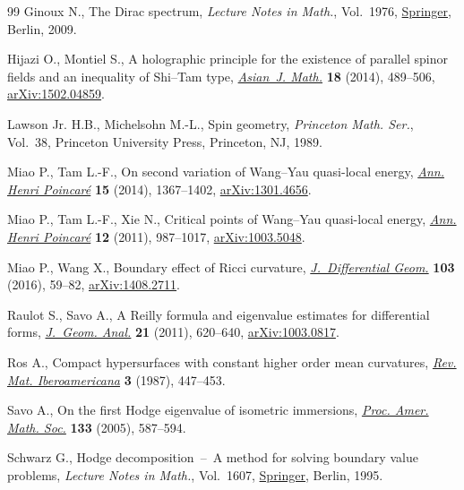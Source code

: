 \documentclass[pdftex]{sigma}
\numberwithin{equation}{section}
\begin{document}
\begin{thebibliography}{99}
Ginoux N., The {D}irac spectrum, \textit{Lecture Notes in Math.}, Vol.~1976,
  \href{https://doi.org/10.1007/978-3-642-01570-0}{Springer}, Berlin, 2009.

Hijazi O., Montiel S., A holographic principle for the existence of parallel
  spinor fields and an inequality of {S}hi--{T}am type, \href{https://doi.org/10.4310/AJM.2014.v18.n3.a6}{\textit{Asian~J. Math.}}
  \textbf{18} (2014), 489--506, \href{https://arxiv.org/abs/1502.04859}{arXiv:1502.04859}.

Lawson Jr. H.B., Michelsohn M.-L., Spin geometry, \textit{Princeton Math. Ser.},
  Vol.~38, Princeton University Press, Princeton, NJ, 1989.

Miao P., Tam L.-F., On second variation of {W}ang--{Y}au quasi-local energy,
  \href{https://doi.org/10.1007/s00023-013-0279-z}{\textit{Ann. Henri Poincar\'e}} \textbf{15} (2014), 1367--1402,
  \href{https://arxiv.org/abs/1301.4656}{arXiv:1301.4656}.

Miao P., Tam L.-F., Xie N., Critical points of {W}ang--{Y}au quasi-local energy,
  \href{https://doi.org/10.1007/s00023-011-0097-0}{\textit{Ann. Henri Poincar\'e}} \textbf{12} (2011), 987--1017,
  \href{https://arxiv.org/abs/1003.5048}{arXiv:1003.5048}.

Miao P., Wang X., Boundary effect of {R}icci curvature, \href{http://doi.org/10.4310/jdg/1460463563}{\textit{J.~Differential
  Geom.}} \textbf{103} (2016), 59--82, \href{https://arxiv.org/abs/1408.2711}{arXiv:1408.2711}.

Raulot S., Savo A., A {R}eilly formula and eigenvalue estimates for
  differential forms, \href{https://doi.org/10.1007/s12220-010-9161-0}{\textit{J.~Geom. Anal.}} \textbf{21} (2011), 620--640,
  \href{https://arxiv.org/abs/1003.0817}{arXiv:1003.0817}.

Ros A., Compact hypersurfaces with constant higher order mean curvatures,
  \href{https://doi.org/10.4171/RMI/58}{\textit{Rev. Mat. Iberoamericana}} \textbf{3} (1987), 447--453.

Savo A., On the first {H}odge eigenvalue of isometric immersions, \href{https://doi.org/10.1090/S0002-9939-04-07702-0}{\textit{Proc.
  Amer. Math. Soc.}} \textbf{133} (2005), 587--594.

Schwarz G., Hodge decomposition~--~A method for solving boundary value
  problems, \textit{Lecture Notes in Math.}, Vol.~1607, \href{https://doi.org/10.1007/BFb0095978}{Springer}, Berlin, 1995.


\end{thebibliography}
\end{document}
